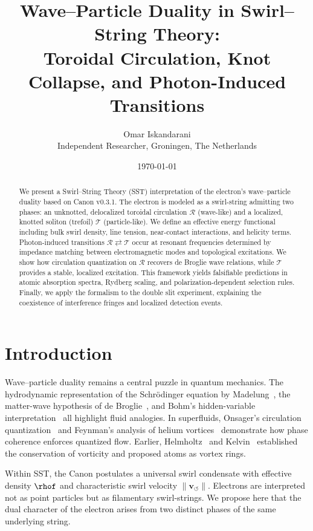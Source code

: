 \documentclass[11pt,a4paper]{article}
\title{Wave--Particle Duality in Swirl--String Theory: \\
Toroidal Circulation, Knot Collapse, and Photon-Induced Transitions}
\author{Omar Iskandarani \\ Independent Researcher, Groningen, The Netherlands}
\date{\today}
\begin{document}
\maketitle

\begin{abstract}
We present a Swirl--String Theory (SST) interpretation of the electron’s
wave--particle duality based on Canon v0.3.1.
The electron is modeled as a swirl-string admitting two phases:
an unknotted, delocalized toroidal circulation $\mathcal R$
(wave-like) and a localized, knotted soliton (trefoil) $\mathcal T$ (particle-like).
We define an effective energy functional including bulk swirl density, line tension,
near-contact interactions, and helicity terms.
Photon-induced transitions $\mathcal R \rightleftarrows \mathcal T$ occur at resonant
frequencies determined by impedance matching between electromagnetic modes
and topological excitations.
We show how circulation quantization on $\mathcal R$ recovers
de Broglie wave relations, while $\mathcal T$ provides a stable, localized excitation.
This framework yields falsifiable predictions in atomic absorption spectra,
Rydberg scaling, and polarization-dependent selection rules.
Finally, we apply the formalism to the double slit experiment, explaining
the coexistence of interference fringes and localized detection events.
\end{abstract}

\section{Introduction}

    Wave--particle duality remains a central puzzle in quantum mechanics.
    The hydrodynamic representation of the Schrödinger equation
    by Madelung~\cite{Madelung1927}, the matter-wave hypothesis of de Broglie~\cite{deBroglie1925},
    and Bohm’s hidden-variable interpretation~\cite{Bohm1952a,Bohm1952b}
    all highlight fluid analogies.
    In superfluids, Onsager’s circulation quantization~\cite{Onsager1949}
    and Feynman’s analysis of helium vortices~\cite{Feynman1955}
    demonstrate how phase coherence enforces quantized flow.
    Earlier, Helmholtz~\cite{Helmholtz1858} and Kelvin~\cite{Kelvin1869}
    established the conservation of vorticity and proposed atoms as vortex rings.

    Within SST, the Canon postulates a universal swirl condensate with
    effective density $\rhof$ and characteristic swirl velocity $\|\mathbf v_{\circlearrowleft}\|$.
    Electrons are interpreted not as point particles but as filamentary swirl-strings.
    We propose here that the dual character of the electron
    arises from two distinct phases of the same underlying string.
\end{document}
